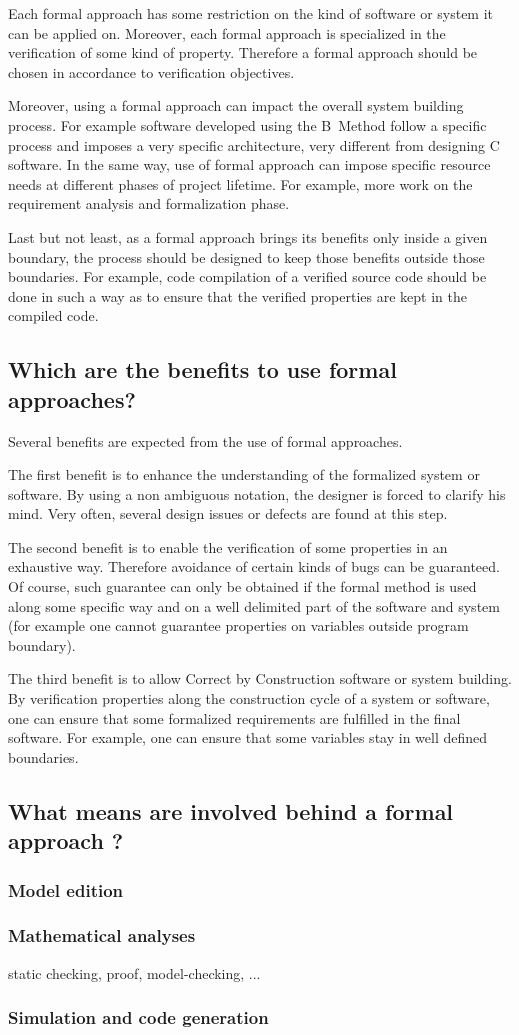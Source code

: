 Each formal approach has some restriction on the kind of software or
system it can be applied on. Moreover, each formal approach is
specialized in the verification of some kind of property. Therefore a
formal approach should be chosen in accordance to verification
objectives.

Moreover, using a formal approach can impact the overall system
building process. For example software developed using the B~Method
follow a specific process and imposes a very specific architecture,
very different from designing C software. In the same way, use of
formal approach can impose specific resource needs at different phases
of project lifetime. For example, more work on the requirement
analysis and formalization phase.

Last but not least, as a formal approach brings its benefits only
inside a given boundary, the process should be designed to keep those
benefits outside those boundaries. For example, code compilation of a
verified source code should be done in such a way as to ensure that
the verified properties are kept in the compiled code.

\subsection{Which are the benefits to use formal approaches?}

Several benefits are expected from the use of formal approaches.

The first benefit is to enhance the understanding of the formalized
system or software. By using a non ambiguous notation, the designer is
forced to clarify his mind. Very often, several design issues or
defects are found at this step.

The second benefit is to enable the verification of some properties in
an exhaustive way. Therefore avoidance of certain kinds of bugs can be
guaranteed. Of course, such guarantee can only be obtained if the
formal method is used along some specific way and on a well delimited
part of the software and system (for example one cannot guarantee
properties on variables outside program boundary).

The third benefit is to allow Correct by Construction software or
system building. By verification properties along the construction
cycle of a system or software, one can ensure that some formalized
requirements are fulfilled in the final software. For example, one can
ensure that some variables stay in well defined boundaries.

\subsection{What means are involved behind a formal approach ?}

\subsubsection{Model edition}

\subsubsection{Mathematical analyses}
static checking, proof, model-checking, ...

\subsubsection{Simulation and code generation}

